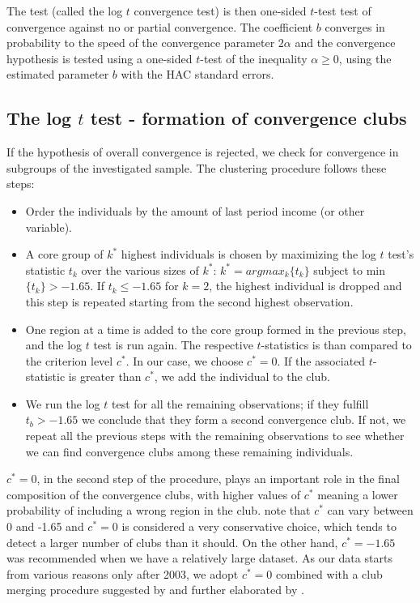 \documentclass[11pt]{article}
\begin{document}
The test (called the log $t$ convergence test) is then one-sided $t$-test test of convergence against no or partial convergence. The coefficient $b$ converges in probability to the speed of the convergence parameter $2\alpha$ and the convergence hypothesis is tested using a one-sided $t$-test of the inequality \(\alpha \geq 0 \), using the estimated parameter $b$ with the HAC standard errors.%

\subsection{The log $t$ test - formation of convergence clubs }
If the hypothesis of overall convergence is rejected, we check for convergence in subgroups of the investigated sample. The clustering procedure follows these steps:
\begin{itemize}
    \item Order the individuals by the amount of last period income (or other variable).
    \item  A core group of $k^{*}$ highest individuals is chosen by maximizing the log $t$ test's statistic $t_{k}$ over the various sizes of $k^{*}$:
    \(k^{*} = arg max_{k}\{t_{k}\}\) subject to min \( \{t_{k}\}> -1.65\). If \(t_{k} \leq -1.65 \) for \(k=2\), the highest individual is dropped and this step is repeated starting from the second highest observation. 
    \item One region at a time is added to the core group formed in the previous step, and the log $t$ test is run again. The respective  $t$-statistics is than compared to the criterion level $c^{*}$. In our case, we choose $c^{*}=0$. If the associated $t$-statistic is greater than  $c^{*}$, we add the individual to the club.
    \item We run the log $t$ test for all the remaining observations; if they fulfill \(t_b > -1.65\) we conclude that they form a second convergence club. If not, we repeat all the previous steps with the remaining observations to see whether we can find convergence clubs among these remaining individuals.
\end{itemize}    

 \(c^{*} = 0\), in the second step of the procedure, plays an important role in the final composition of the convergence clubs, with higher values of $c^*$ meaning a lower probability of including a wrong region in the club. \citet{phillips2009economic} note that $c^{*}$ can vary between 0 and -1.65 and $c^{*}=0$ is considered a very conservative choice, which tends to detect a larger number of clubs than it should. On the other hand, $c^{*}=-1.65$ was recommended when we have a relatively large dataset. As our data starts from various reasons only after 2003, we adopt $c^*= 0$ combined with a club merging procedure suggested by \citet{phillips2009economic} and further elaborated by \citet{bartkowska2012regional}. 
\end{document}
